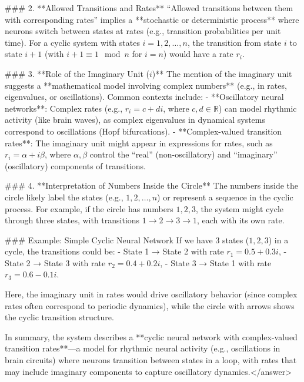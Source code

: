 ### 2. **Allowed Transitions and Rates**  
“Allowed transitions between them with corresponding rates” implies a **stochastic or deterministic process** where neurons switch between states at rates (e.g., transition probabilities per unit time). For a cyclic system with states \( i = 1, 2, \dots, n \), the transition from state \( i \) to state \( i+1 \) (with \( i+1 \equiv 1 \mod n \) for \( i = n \)) would have a rate \( r_i \).  


### 3. **Role of the Imaginary Unit (\( i \))**  
The mention of the imaginary unit suggests a **mathematical model involving complex numbers** (e.g., in rates, eigenvalues, or oscillations). Common contexts include:  
- **Oscillatory neural networks**: Complex rates (e.g., \( r_i = c + di \), where \( c, d \in \mathbb{R} \)) can model rhythmic activity (like brain waves), as complex eigenvalues in dynamical systems correspond to oscillations (Hopf bifurcations).  
- **Complex-valued transition rates**: The imaginary unit might appear in expressions for rates, such as \( r_i = \alpha + i\beta \), where \( \alpha, \beta \) control the “real” (non-oscillatory) and “imaginary” (oscillatory) components of transitions.  


### 4. **Interpretation of Numbers Inside the Circle**  
The numbers inside the circle likely label the states (e.g., \( 1, 2, \dots, n \)) or represent a sequence in the cyclic process. For example, if the circle has numbers \( 1, 2, 3 \), the system might cycle through three states, with transitions \( 1 \to 2 \to 3 \to 1 \), each with its own rate.  


### Example: Simple Cyclic Neural Network  
If we have 3 states (\( 1, 2, 3 \)) in a cycle, the transitions could be:  
- State 1 → State 2 with rate \( r_1 = 0.5 + 0.3i \),  
- State 2 → State 3 with rate \( r_2 = 0.4 + 0.2i \),  
- State 3 → State 1 with rate \( r_3 = 0.6 - 0.1i \).  

Here, the imaginary unit in rates would drive oscillatory behavior (since complex rates often correspond to periodic dynamics), while the circle with arrows shows the cyclic transition structure.  


In summary, the system describes a **cyclic neural network with complex-valued transition rates**—a model for rhythmic neural activity (e.g., oscillations in brain circuits) where neurons transition between states in a loop, with rates that may include imaginary components to capture oscillatory dynamics.</answer>